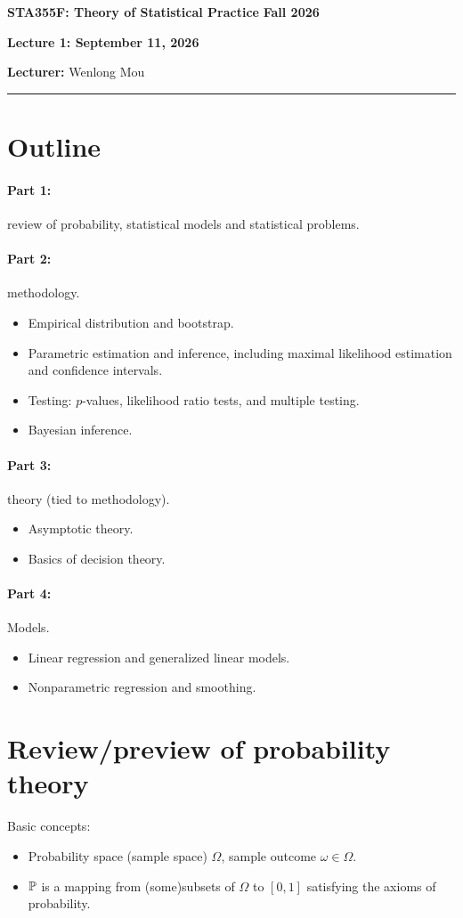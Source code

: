 \documentclass[11pt,letterpaper]{article}
\newcommand{\coursenumber}{STA355F}
\newcommand{\coursetitle}{Theory of Statistical Practice}
\newcommand{\courseterm}{Fall 2026}
\newcommand{\lecturenumber}{1}
\newcommand{\lecturedate}{September 11, 2026}
\newcommand{\lecturer}{Wenlong Mou}
\newcommand{\makelecturenotesheader}{%
  \noindent
  \textbf{\coursenumber: \coursetitle}%
  \hfill
  \textbf{\courseterm}

  \begin{center}
    {\Large\bfseries Lecture \lecturenumber: \lecturedate}
  \end{center}

  \noindent
  \textbf{Lecturer:} \lecturer
  \par\medskip
  \hrule
  \bigskip
}
\begin{document}
\makelecturenotesheader
\section{Outline}
\paragraph{Part 1:} review of probability, statistical models and statistical problems.

\paragraph{Part 2:} methodology.
\begin{itemize}
  \item Empirical distribution and bootstrap.
  \item Parametric estimation and inference, including maximal likelihood estimation and confidence intervals.
  \item Testing: $p$-values, likelihood ratio tests, and multiple testing.
  \item Bayesian inference.
\end{itemize}

\paragraph{Part 3:} theory (tied to methodology).
\begin{itemize}
  \item Asymptotic theory.
  \item Basics of decision theory.
\end{itemize}

\paragraph{Part 4:} Models.
\begin{itemize}
  \item Linear regression and generalized linear models.
  \item Nonparametric regression and smoothing.
\end{itemize}

\section{Review/preview of probability theory}
Basic concepts:
\begin{itemize}
  \item Probability space (sample space) $\Omega$, sample outcome $\omega \in \Omega$.
  \item ${\mathbb{P}}$ is a mapping from (some)subsets of $\Omega$ to $[0,1]$ satisfying the axioms of probability.
\end{itemize}
\end{document}
